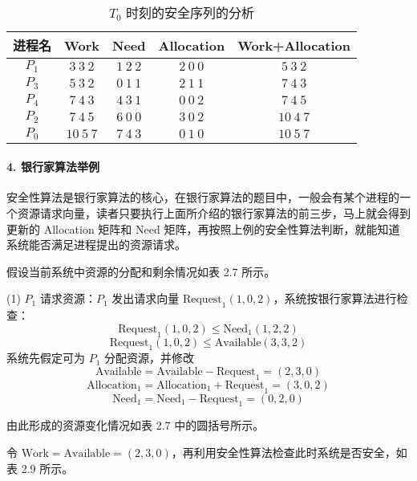 \documentclass{ctexbook}
\begin{document}
	\begin{table}[h]
		\centering
		\caption{$T_0$ 时刻的安全序列的分析}
		\label{tab:t0_safe_sequence}
		\begin{tabular}{|c|c|c|c|c|}
			\hline
			进程名 & Work & Need & Allocation & Work+Allocation \\
			\hline
			$P_1$ & $3 \ 3 \ 2$ & $1 \ 2 \ 2$ & $2 \ 0 \ 0$ & $5 \ 3 \ 2$ \\
			\hline
			$P_3$ & $5 \ 3 \ 2$ & $0 \ 1 \ 1$ & $2 \ 1 \ 1$ & $7 \ 4 \ 3$ \\
			\hline
			$P_4$ & $7 \ 4 \ 3$ & $4 \ 3 \ 1$ & $0 \ 0 \ 2$ & $7 \ 4 \ 5$ \\
			\hline
			$P_2$ & $7 \ 4 \ 5$ & $6 \ 0 \ 0$ & $3 \ 0 \ 2$ & $10 \ 4 \ 7$ \\
			\hline
			$P_0$ & $10 \ 5 \ 7$ & $7 \ 4 \ 3$ & $0 \ 1 \ 0$ & $10 \ 5 \ 7$ \\
			\hline
		\end{tabular}
	\end{table}
	
	\paragraph{4. 银行家算法举例}
	
	安全性算法是银行家算法的核心，在银行家算法的题目中，一般会有某个进程的一个资源请求向量，读者只要执行上面所介绍的银行家算法的前三步，马上就会得到更新的 Allocation 矩阵和 Need 矩阵，再按照上例的安全性算法判断，就能知道系统能否满足进程提出的资源请求。
	
	假设当前系统中资源的分配和剩余情况如表 2.7 所示。
	
	(1) $P_1$ 请求资源：$P_1$ 发出请求向量 $\text{Request}_1(1, 0, 2)$，系统按银行家算法进行检查：
	\[
	\text{Request}_1(1, 0, 2) \leq \text{Need}_1(1, 2, 2)
	\]
	\[
	\text{Request}_1(1, 0, 2) \leq \text{Available}(3, 3, 2)
	\]
	系统先假定可为 $P_1$ 分配资源，并修改
		\[ 
		\text{Available} = \text{Available} - \text{Request}_1 = (2, 3, 0)
		\]
		\[ 
		\text{Allocation}_1 = \text{Allocation}_1 + \text{Request}_1 = (3, 0, 2)
		\]
		\[ 
		\text{Need}_1 = \text{Need}_1 - \text{Request}_1 = (0, 2, 0)
		\]
		
		由此形成的资源变化情况如表 2.7 中的圆括号所示。
		
		令 $\text{Work} = \text{Available} = (2, 3, 0)$，再利用安全性算法检查此时系统是否安全，如表 2.9 所示。
		
\end{document}
